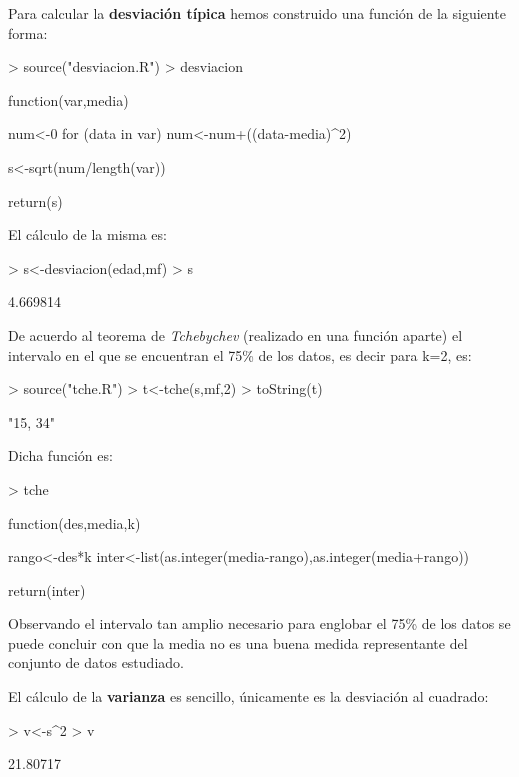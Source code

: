 \documentclass [a4paper] {article}
\begin{document}
Para calcular la \textbf{desviaci\'on t\'ipica} hemos construido una funci\'on de la siguiente
forma:
\begin{Schunk}
\begin{Sinput}
> source("desviacion.R")
> desviacion
\end{Sinput}
\begin{Soutput}
function(var,media) {
    num<-0
    for (data in var){
        num<-num+((data-media)^2)
    }

    s<-sqrt(num/length(var))

    return(s)
}
\end{Soutput}
\end{Schunk}

El c\'alculo de la misma es:
\begin{Schunk}
\begin{Sinput}
> s<-desviacion(edad,mf)
> s
\end{Sinput}
\begin{Soutput}
[1] 4.669814
\end{Soutput}
\end{Schunk}

\bigskip
De acuerdo al teorema de \textit{Tchebychev} (realizado en una funci\'on aparte) el intervalo en el que se encuentran el 75\%
de los datos, es decir para k=2, es:
\begin{Schunk}
\begin{Sinput}
> source("tche.R")
> t<-tche(s,mf,2)
> toString(t)
\end{Sinput}
\begin{Soutput}
[1] "15, 34"
\end{Soutput}
\end{Schunk}

Dicha funci\'on es:
\begin{Schunk}
\begin{Sinput}
> tche
\end{Sinput}
\begin{Soutput}
function(des,media,k) {
    
    rango<-des*k
    inter<-list(as.integer(media-rango),as.integer(media+rango))

    return(inter)
}
\end{Soutput}
\end{Schunk}

Observando el intervalo tan amplio necesario para englobar el 75\% de los datos se puede concluir con que la media
no es una buena medida representante del conjunto de datos estudiado.

\bigskip
El c\'alculo de la \textbf{varianza} es sencillo, \'unicamente es la desviaci\'on al cuadrado:
\begin{Schunk}
\begin{Sinput}
> v<-s^2
> v
\end{Sinput}
\begin{Soutput}
[1] 21.80717
\end{Soutput}
\end{Schunk}
\end{document}
